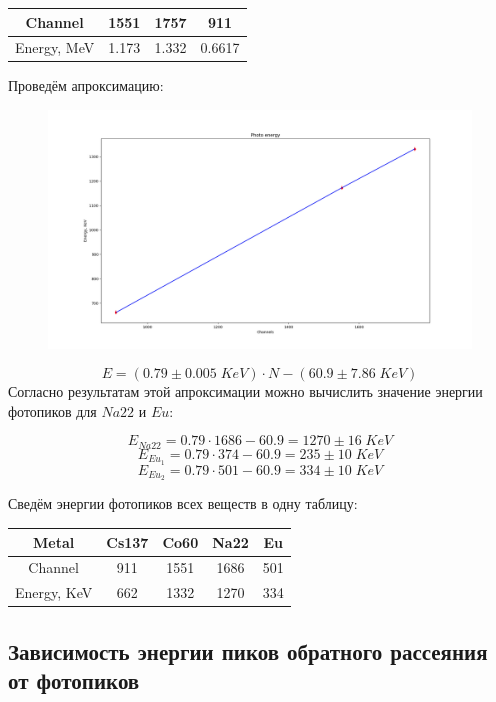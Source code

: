 \documentclass{article}
\begin{document}
\begin{table}[H]
	\centering
	\begin{tabular}{|c|c|c|c|}
		\hline
		Channel     & 1551  & 1757  & 911\\\hline
		Energy, MeV & 1.173 & 1.332 & 0.6617 \\\hline
	\end{tabular}
\end{table}
Проведём апроксимацию:

\begin{figure}[H]
	\includegraphics[width=\textwidth]{channel-energy.png}
\end{figure}

\[E = (0.79 \pm 0.005\;KeV)\cdot N-(60.9 \pm 7.86\;KeV)\]
Согласно результатам этой апроксимации можно вычислить значение энергии фотопиков для
\(Na22\) и \(Eu\):

\[E_{Na22} = 0.79 \cdot 1686 - 60.9 = 1270 \pm 16\; KeV \]
\[E_{Eu_1} = 0.79 \cdot 374 - 60.9 = 235 \pm 10\; KeV  \]
\[E_{Eu_2} = 0.79 \cdot 501 - 60.9 = 334 \pm 10\; KeV  \]

Сведём энергии фотопиков всех веществ в одну таблицу:
\begin{table}[H]
	\centering
	\begin{tabular}{|c|c|c|c|c|}
		\hline
		Metal       & Cs137 & Co60  & Na22 & Eu\\\hline
		Channel     & 911   & 1551  & 1686 & 501\\\hline
		Energy, KeV & 662   & 1332  & 1270 & 334\\\hline
	\end{tabular}
\end{table}
\subsection{Зависимость энергии пиков обратного рассеяния от фотопиков}
\end{document}
